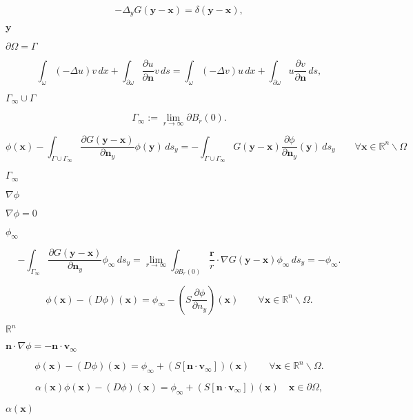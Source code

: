 \documentclass{article}
\begin{document}
\[ -\Delta_y G(\mathbf{y}-\mathbf{x}) = \delta(\mathbf{y}-\mathbf{x}), \]
\pagebreak

$\mathbf{y}$
\pagebreak

$\partial\Omega = \Gamma$
\pagebreak

\[\label{green} \int_{\omega} (-\Delta u)v\,dx + \int_{\partial\omega} \frac{\partial u}{\partial \mathbf{n} }v \,ds = \int_{\omega} (-\Delta v)u\,dx + \int_{\partial\omega} u\frac{\partial v}{\partial \mathbf{n}} \,ds, \]
\pagebreak

$ \Gamma_\infty \cup \Gamma$
\pagebreak

\[ \Gamma_\infty := \lim_{r\to\infty} \partial B_r(0). \]
\pagebreak

\[ \phi(\mathbf{x}) - \int_{\Gamma\cup\Gamma_\infty}\frac{\partial G(\mathbf{y}-\mathbf{x})}{\partial \mathbf{n}_y}\phi(\mathbf{y})\,ds_y = -\int_{\Gamma\cup\Gamma_\infty}G(\mathbf{y}-\mathbf{x})\frac{\partial \phi}{\partial \mathbf{n}_y}(\mathbf{y})\,ds_y \qquad \forall\mathbf{x}\in \mathbb{R}^n\backslash\Omega \]
\pagebreak

$\Gamma_\infty$
\pagebreak

$\nabla \phi$
\pagebreak

$\nabla\phi=0$
\pagebreak

$\phi_\infty$
\pagebreak

\[ -\int_{\Gamma_\infty} \frac{\partial G(\mathbf{y}-\mathbf{x})} {\partial \mathbf{n}_y}\phi_\infty \,ds_y = \lim_{r\to\infty} \int_{\partial B_r(0)} \frac{\mathbf{r}}{r} \cdot \nabla G(\mathbf{y}-\mathbf{x}) \phi_\infty \,ds_y = -\phi_\infty. \]
\pagebreak

\[\label{integral} \phi(\mathbf{x}) - (D\phi)(\mathbf{x}) = \phi_\infty -\left(S \frac{\partial \phi}{\partial n_y}\right)(\mathbf{x}) \qquad \forall\mathbf{x}\in \mathbb{R}^n\backslash\Omega. \]
\pagebreak

$\mathbb{R}^n$
\pagebreak

$\mathbf{n}\cdot\nabla\phi = -\mathbf{n}\cdot\mathbf{v}_\infty$
\pagebreak

\[ \phi(\mathbf{x}) - (D\phi)(\mathbf{x}) = \phi_\infty + \left(S[\mathbf{n}\cdot\mathbf{v}_\infty]\right)(\mathbf{x}) \qquad \forall\mathbf{x} \in \mathbb{R}^n\backslash\Omega. \]
\pagebreak

\[\label{SD} \alpha(\mathbf{x})\phi(\mathbf{x}) - (D\phi)(\mathbf{x}) = \phi_\infty + \left(S [\mathbf{n}\cdot\mathbf{v}_\infty]\right)(\mathbf{x}) \quad \mathbf{x}\in \partial\Omega, \]
\pagebreak

$\alpha(\mathbf{x})$
\pagebreak
\end{document}
